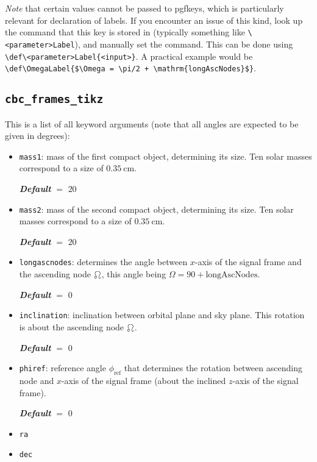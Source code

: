 \documentclass[
    DIV=11,
    BCOR=0mm,
    paper=a4,
    fontsize=11pt,
    twoside=false,
    titlepage=true
]{scrartcl}
\newcommand{\code}[1]{\textcolor{codecolor}{\texttt{#1}}}
\newcommand{\defaultval}[1]{%
    {\bfseries\slshape%
    Default} $=$ #1%
}
\begin{document}
\emph{Note} that certain values cannot be passed to pgfkeys, which is
particularly relevant for declaration of labels. If you encounter an issue of
this kind, look up the command that this key is stored in (typically something
like \verb|\<parameter>Label|), and manually set the command. This can be done
using \verb|\def\<parameter>Label{<input>}|. A practical example would be
\verb|\def\OmegaLabel{$\Omega = \pi/2 + \mathrm{longAscNodes}$}|.


        \subsection{\texttt{cbc\_frames\_tikz}}

This is a list of all keyword arguments (note that all angles are expected to
be given in degrees):
\begin{itemize}
    \item \code{mass1}: mass of the first compact object, determining its
    size. Ten solar masses correspond to a size of $\SI{0.35}{\centi\metre}$.
    
    \defaultval{$20$}


    \item \code{mass2}: mass of the second compact object, determining its
    size. Ten solar masses correspond to a size of $\SI{0.35}{\centi\metre}$.
    
    \defaultval{$20$}
    
    
    \item \code{longascnodes}: determines the angle between $x$-axis of the
    signal frame and the ascending node $\ascnode$, this angle being
    $\Omega = 90 + \mathrm{longAscNodes}$.
    
    \defaultval{$0$}


    \item \code{inclination}: inclination between orbital plane and sky plane.
    This rotation is about the ascending node $\ascnode$.
    
    \defaultval{$0$}
    
    
    \item \code{phiref}: reference angle $\phi_\mathrm{ref}$ that determines
    the rotation between ascending node and $x$-axis of the signal frame
    (about the inclined $z$-axis of the signal frame).
    
    \defaultval{$0$}
    
    
    \item \code{ra}
    
    
    \item \code{dec}
    

\end{itemize}
\end{document}
